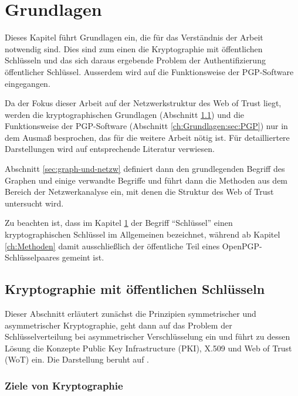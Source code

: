 
\chapter{Grundlagen}
\label{ch:Grundlagen}

Dieses Kapitel führt Grundlagen ein, die für das Verständnis der
Arbeit notwendig sind. Dies sind zum einen die Kryptographie mit
öffentlichen Schlüsseln und das sich daraus ergebende Problem der
Authentifizierung öffentlicher Schlüssel. Ausserdem wird auf die
Funktionsweise der PGP-Software eingegangen.

Da der Fokus dieser Arbeit auf der Netzwerkstruktur des Web of Trust
liegt, werden die kryptographischen Grundlagen (Abschnitt
\ref{ch:Grundlagen:sec:PublicKeyCrypto}) und die Funktionsweise
der PGP-Software (Abschnitt \ref{ch:Grundlagen:sec:PGP}) nur in dem Ausmaß besprochen, das für die weitere
Arbeit nötig ist. Für detailliertere Darstellungen wird auf
entsprechende Literatur verwiesen.

Abschnitt \ref{sec:graph-und-netzw} definiert dann den
grundlegenden Begriff des Graphen und einige verwandte Begriffe und
führt dann die Methoden aus dem Bereich der Netzwerkanalyse ein, mit
denen die Struktur des Web of Trust untersucht wird.

Zu beachten ist, dass im Kapitel \ref{ch:Grundlagen} der Begriff
"`Schlüssel"' einen kryptographischen Schlüssel im Allgemeinen
bezeichnet, während ab Kapitel \ref{ch:Methoden} damit
ausschließlich der öffentliche Teil eines OpenPGP-Schlüsselpaares
gemeint ist.

\section{Kryptographie mit öffentlichen Schlüsseln}
\label{ch:Grundlagen:sec:PublicKeyCrypto}

Dieser Abschnitt erläutert zunächst die Prinzipien symmetrischer
und asymmetrischer Kryptographie, geht dann auf das Problem der
Schlüsselverteilung bei asymmetrischer Verschlüsselung ein und
führt zu dessen Lösung die Konzepte Public Key Infrastructure
(PKI), X.509 und Web of Trust (WoT) ein. Die Darstellung beruht auf
\cite{Menezes1996}.

\subsection{Ziele von Kryptographie}
\label{sec:ziele-von-krypt}


